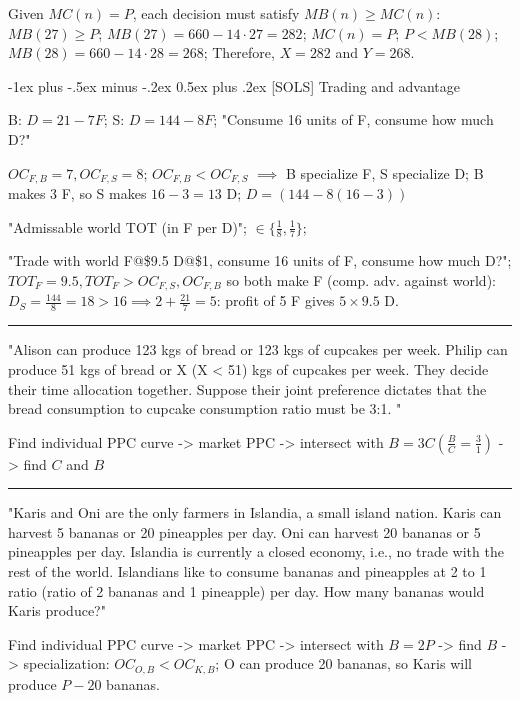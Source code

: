 \documentclass[a4paper]{article}
\makeatletter
\renewcommand{\section}{\@startsection{section}{1}{0mm}%
                                {-1ex plus -.5ex minus -.2ex}%
                                {0.5ex plus .2ex}%
                                {\normalfont\large\bfseries}}
\makeatother
\begin{document}
\begin{multicols*}{3}
        Given $MC(n) = P$, each decision must satisfy $MB(n) \geq MC(n)$: $MB(27) \geq P$; $MB(27) = 660 - 14 \cdot 27 = 282$; $MC(n) = P$; $P < MB(28)$; $MB(28) = 660 - 14 \cdot 28 = 268$; Therefore, $X = 282$ and $Y = 268$.

        \section{[SOLS] Trading and advantage}

        B: $D = 21 − 7F$; S: $D = 144 - 8F$; "Consume 16 units of F, consume how much D?"


    $OC_{F,B}=7, OC_{F,S}=8$; $OC_{F,B} < OC_{F,S}$ $\implies$ B specialize F, S specialize D; B makes 3 F, so S makes $16-3=13$ D; $D=(144-8(16-3))$

        "Admissable world TOT (in F per D)"; $\in \{\frac{1}{8}, \frac{1}{7}\}$;

        "Trade with world F@\$9.5 D@\$1, consume 16 units of F, consume how much D?"; $TOT_F=9.5, TOT_F>OC_{F,S},OC_{F,B}$ so both make F (comp. adv. against world): $D_S=\frac{144}{8}=18>16 \implies 2 + \frac{21}{7} = 5$: profit of 5 F gives $5\times9.5$ D.

        \rule{1\linewidth}{0.4pt}

        "Alison can produce 123 kgs of bread or 123 kgs of cupcakes per week. Philip can produce 51 kgs of bread or X (X < 51) kgs of cupcakes per week. They decide their time allocation together. Suppose their joint preference dictates that the bread consumption to cupcake consumption ratio must be 3:1. "

        Find individual PPC curve -> market PPC -> intersect with $B=3C (\frac{B}{C}=\frac31)$ -> find $C$ and $B$

        \rule{1\linewidth}{0.4pt}

        "Karis and Oni are the only farmers in Islandia, a small island nation. Karis can harvest 5 bananas or 20 pineapples per day. Oni can harvest 20 bananas or 5 pineapples per day. Islandia is currently a closed economy, i.e., no trade with the rest of the world. Islandians like to consume bananas and pineapples at 2 to 1 ratio (ratio of 2 bananas and 1 pineapple) per day. How many bananas would Karis produce?"

        Find individual PPC curve -> market PPC -> intersect with $B=2P$ -> find $B$ -> specialization: $OC_{O,B} < OC_{K,B}$; O can produce 20 bananas, so Karis will produce $P-20$ bananas.


\end{multicols*}
\end{document}
